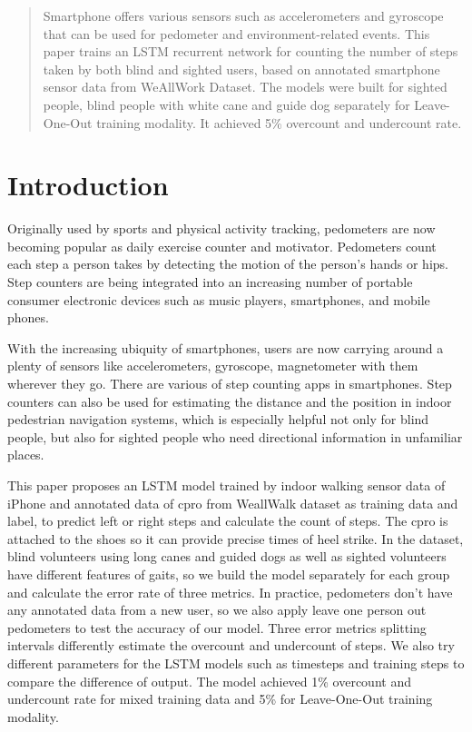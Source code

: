 \documentclass[11pt]{article}
\begin{document}
{\begin{abstract}
Smartphone offers various sensors such as accelerometers and gyroscope that can be used for pedometer and environment-related events. This paper trains an LSTM recurrent network for counting the number of steps taken by both blind and sighted users, based on annotated smartphone sensor data from WeAllWork Dataset. The models were built for sighted people, blind people with white cane and guide dog separately for Leave-One-Out training modality. It achieved 5\% overcount and undercount rate.

\end{abstract}

\section{Introduction}

Originally used by sports and physical activity tracking, pedometers are now becoming popular as daily exercise counter and motivator. Pedometers count each step a person takes by detecting the motion of the person's hands or hips. Step counters are being integrated into an increasing number of portable consumer electronic devices such as music players, smartphones, and mobile phones. 

With the increasing ubiquity of smartphones, users are now carrying around a plenty of sensors like accelerometers, gyroscope, magnetometer with them wherever they go. There are various of step counting apps in smartphones. Step counters can also be used for estimating the distance and the position in indoor pedestrian navigation systems, which is especially helpful not only for blind people, but also for sighted people who need directional information in unfamiliar places.

This paper proposes an LSTM model trained by indoor walking sensor data of iPhone and annotated data of cpro from WeallWalk dataset as training data and label, to predict left or right steps and calculate the count of steps. The cpro is attached to the shoes so it can provide precise times of heel strike. In the dataset, blind volunteers using long canes and guided dogs as well as sighted volunteers have different features of gaits, so we build the model separately for each group and calculate the error rate of three metrics. In practice, pedometers don't have any annotated data from a new user, so we also apply leave one person out pedometers to test the accuracy of our model. Three error metrics splitting intervals differently estimate the overcount and undercount of steps. We also try different parameters for the LSTM models such as timesteps and training steps to compare the difference of output. The model achieved 1\% overcount and undercount rate for mixed training data and 5\% for Leave-One-Out training modality.



}
\end{document}
